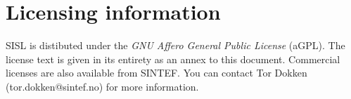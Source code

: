 \section{Licensing information}
SISL is distibuted under the \emph{GNU Affero General Public License} (aGPL).  The license text 
is given in its entirety as an annex to this document.  Commercial licenses are also
available from SINTEF.  You can contact Tor Dokken (tor.dokken@sintef.no) for more
information.

